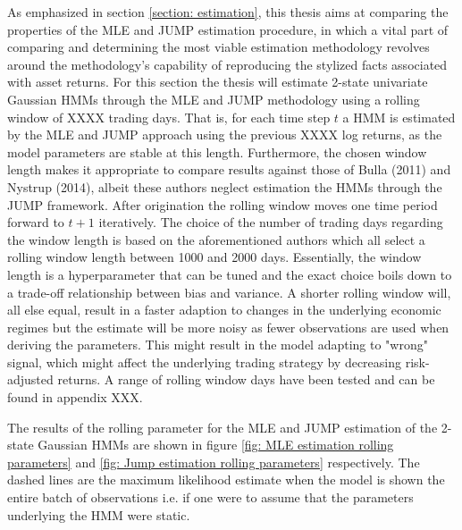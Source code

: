 As emphasized in section \ref{section: estimation}, this thesis aims at comparing the properties of the MLE and JUMP estimation procedure, in which a vital part of comparing and determining the most viable estimation methodology revolves around the methodology's capability of reproducing the stylized facts associated with asset returns. For this section the thesis will estimate 2-state univariate Gaussian HMMs through the MLE and JUMP methodology using a rolling window of XXXX trading days. That is, for each time step $t$ a HMM is estimated by the MLE and JUMP approach using the previous XXXX log returns, as the model parameters are stable at this length. Furthermore, the chosen window length makes it appropriate to compare results against those of Bulla (2011) and Nystrup (2014), albeit these authors neglect estimation the HMMs through the JUMP framework. After origination the rolling window moves one time period forward to $t+1$ iteratively. The choice of the number of trading days regarding the window length is based on the aforementioned authors which all select a rolling window length between 1000 and 2000 days. Essentially, the window length is a hyperparameter that can be tuned and the exact choice boils down to a trade-off relationship between bias and variance. A shorter rolling window will, all else equal, result in a faster adaption to changes in the underlying economic regimes but the estimate will be more noisy as fewer observations are used when deriving the parameters. This might result in the model adapting to "wrong" signal, which might affect the underlying trading strategy by decreasing risk-adjusted returns. A range of rolling window days have been tested and can be found in appendix XXX.

The results of the rolling parameter for the MLE and JUMP estimation of the 2-state Gaussian HMMs are shown in figure \ref{fig: MLE estimation rolling parameters} and \ref{fig: Jump estimation rolling parameters} respectively. The dashed lines are the maximum likelihood estimate when the model is shown the entire batch of observations i.e. if one were to assume that the parameters underlying the HMM were static. 

